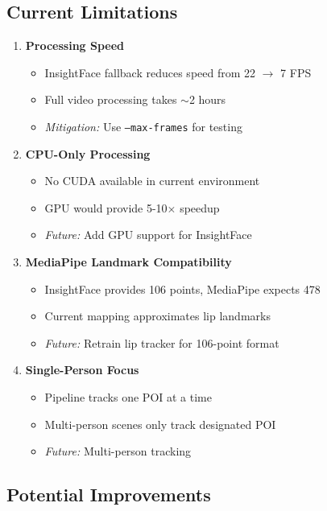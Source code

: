 \documentclass[11pt,a4paper]{article}
\begin{document}
\subsection{Current Limitations}

\begin{enumerate}
    \item \textbf{Processing Speed}
    \begin{itemize}
        \item InsightFace fallback reduces speed from 22 $\rightarrow$ 7 FPS
        \item Full video processing takes $\sim$2 hours
        \item \textit{Mitigation:} Use \texttt{--max-frames} for testing
    \end{itemize}
    
    \item \textbf{CPU-Only Processing}
    \begin{itemize}
        \item No CUDA available in current environment
        \item GPU would provide 5-10$\times$ speedup
        \item \textit{Future:} Add GPU support for InsightFace
    \end{itemize}
    
    \item \textbf{MediaPipe Landmark Compatibility}
    \begin{itemize}
        \item InsightFace provides 106 points, MediaPipe expects 478
        \item Current mapping approximates lip landmarks
        \item \textit{Future:} Retrain lip tracker for 106-point format
    \end{itemize}
    
    \item \textbf{Single-Person Focus}
    \begin{itemize}
        \item Pipeline tracks one POI at a time
        \item Multi-person scenes only track designated POI
        \item \textit{Future:} Multi-person tracking
    \end{itemize}
\end{enumerate}

\subsection{Potential Improvements}
\end{document}
